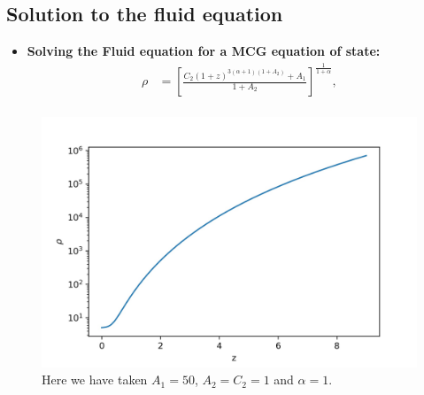 \documentclass{beamer}
\newcommand{\brac}[1]{\left(#1\right)}
\newcommand{\bracc}[1]{\left[#1\right]}
\begin{document}
\subsection{Solution to the fluid equation}
\begin{frame}
\begin{itemize}
\fontsize{8pt}{7.2}\selectfont
\frametitle{\insertsectionhead}
\framesubtitle{\insertsubsectionhead}

\item \textbf{Solving the Fluid equation for a MCG equation of state:}
\begin{equation}\label{eq:FMCGZ}
\begin{split}
\rho  &= \bracc{\frac{C_{2}\brac{1+z}^{3\brac{\alpha+1}\brac{1+A_{2}}}+A_{1}}{1+A_{2}}}^{\frac{1}{1+\alpha}},         \\
\end{split}
\end{equation}

\end{itemize}
\begin{figure}[h]
\centering
\includegraphics[scale=0.45]{Images/ch_rho.jpg}
\caption{Here we have taken $A_{1}=50$, $A_{2}=C_{2}=1$ and $\alpha=1$. }
\label{fig:ChRho}
\end{figure}
\end{frame}
\end{document}

